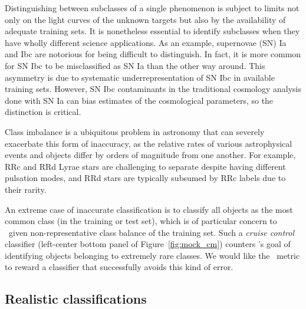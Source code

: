 Distinguishing between subclasses of a single phenomenon is subject to limits not only on the light curves of the unknown targets but also by the availability of adequate training sets.
It is nonetheless essential to identify subclasses when they have wholly different science applications.
As an example, supernovae (SN) Ia and Ibc are notorious for being difficult to distinguish.
In fact, it is more common for SN Ibc to be misclassified as SN Ia than the other way around.
This asymmetry is due to systematic underrepresentation of SN Ibc in available training sets.
However, SN Ibc contaminants in the traditional cosmology analysis done with SN Ia can bias estimates of the cosmological parameters, so the distinction is critical.

Class imbalance is a ubiquitous problem in astronomy that can severely exacerbate this form of inaccuracy, as the relative rates of various astrophysical events and objects differ by orders of magnitude from one another.
For example, RRc and RRd Lyrae stars are challenging to separate despite having different pulsation modes, and RRd stars are typically subsumed by RRc labels due to their rarity.

An extreme case of inaccurate classification is to classify all objects as the most common class (in the training or test set), which is of particular concern to \plasticc\ given non-representative class balance of the training set.
Such a \textit{cruise control} classifier (left-center bottom panel of Figure~\ref{fig:mock_cm}) counters \plasticc's goal of identifying objects belonging to extremely rare classes.
We would like the \plasticc\ metric to reward a classifier that successfully avoids this kind of error.

\subsection{Realistic classifications}
\label{sec:realdata}

